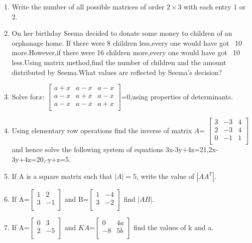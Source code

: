 \begin{enumerate}
    \item Write the number of all possible matrices of order $2\times3$  with  each  entry  1  or  2.
    \item  On her birthday Seema decided to donate some money to children of an orphanage home. If there were 8 children less,every one would have got \rupee~10 more.However,if there were 16 children more,every one would have got \rupee~10 less.Using matrix method,find the number of children and the amount distributed by Seema.What values are reflected by Seema's decision?
    \item Solve for$ x$: $\begin{bmatrix} a+x & a-x & a-x \\ a-x & a+x & a-x \\ a-x & a-x & a+x \\ \end{bmatrix}  $=0,using properties of determinants.
    \item Using elementary row operations find the inverse of matrix $A$= $\begin{bmatrix}3 & -3 & 4 \\ 2 & -3 & 4 \\ 0 & -1 & 1 \\ \end{bmatrix} $ and hence solve the following system of equations 3x-3y+4z=21,2x-3y+4z=20,-y+z=5.
    \item If A is a square matrix such that $|A|= 5$, write the value of $|AA^T|$.
    \item If A=$\begin{bmatrix}1 & 2 \\3&-1\\
              \end{bmatrix}$ and B=$\begin{bmatrix}1&-4\\3&-2\\\end{bmatrix} $ find $|AB|$.\\
    \item If A=$\begin{bmatrix}0 & 3 \\2&-5\\
              \end{bmatrix}$ and $KA$=$\begin{bmatrix}0&4a\\-8&5b\\\end{bmatrix} $ find the values of k and a.\\

\end{enumerate}
